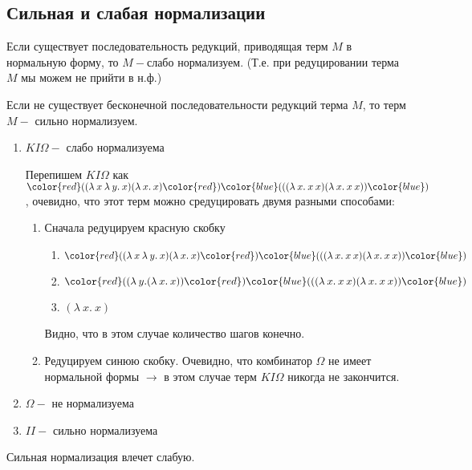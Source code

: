 	\subsection{Сильная и слабая нормализации}
	\begin{definition}Если существует последовательность редукций, приводящая терм $M$ в нормальную форму, то $M-$слабо нормализуем. (Т.е. при редуцировании терма $M$ мы можем не прийти в н.ф.)\end{definition} 
	\begin{definition}Если не существует бесконечной последовательности редукций терма $M$, то терм $M-$ сильно нормализуем.\end{definition} 
	 \begin{statement}
	 \end{statement}
	 \begin{enumerate}
	 	\item $KI\Omega-$ слабо нормализуема
	 		\begin{example}\end{example}
	 		Перепишем $KI\Omega$ как ${\color{red}(}(\lambda\:x\:\lambda\:y.\:x)(\lambda\:x.\:x){\color{red})}{\color{blue}(}((\lambda\:x.\:x\:x)(\lambda\:x.\:x\:x)){\color{blue})}$, очевидно, что этот терм можно средуцировать двумя разными способами:
	 		\begin{enumerate}
	 			\item Сначала редуцируем красную скобку 
	 				\begin{enumerate}
	 					\item ${\color{red}(}(\lambda\:x\:\lambda\:y.\:x)(\lambda\:x.\:x){\color{red})}{\color{blue}(}((\lambda\:x.\:x\:x)(\lambda\:x.\:x\:x)){\color{blue})}$
	 					\item ${\color{red}(}(\lambda\:y.(\lambda\:x.\:x)){\color{red})}{\color{blue}(}((\lambda\:x.\:x\:x)(\lambda\:x.\:x\:x)){\color{blue})}$
	 					\item $(\lambda\:x.\:x)$
	 				\end{enumerate}
	 				Видно, что в этом случае количество шагов конечно.
	 			\item Редуцируем синюю скобку. Очевидно, что комбинатор $\Omega$ не имеет нормальной формы $\rightarrow$ в этом случае терм $KI\Omega$ никогда не закончится.
	 		\end{enumerate}
	 	\item $\Omega-$ не нормализуема
	 	\item $II-$ сильно нормализуема
	 \end{enumerate}
	 \begin{lemma}Сильная нормализация влечет слабую.
	 \end{lemma}
